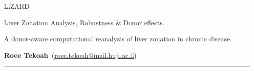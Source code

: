 \documentclass[11pt,a4paper]{article}
\begin{document}
{\LARGE\bfseries\raggedright LiZARD\par}
{\large\bfseries\raggedright Liver Zonation Analysis, Robustness \& Donor effects.\par}
\vspace{0.25em}
\noindent A donor-aware computational reanalysis of liver zonation in chronic disease.\par
\vspace{0.45em}
\noindent\textbf{Roee Tekoah}~(\href{mailto:roee.tekoah@mail.huji.ac.il}{roee.tekoah@mail.huji.ac.il})\par
\vspace{0.12em}
\par
\vspace{0.45em}
\noindent\textcolor{black!40}{\rule{\textwidth}{0.7pt}}\par
\vspace{0.6em}
\end{document}
